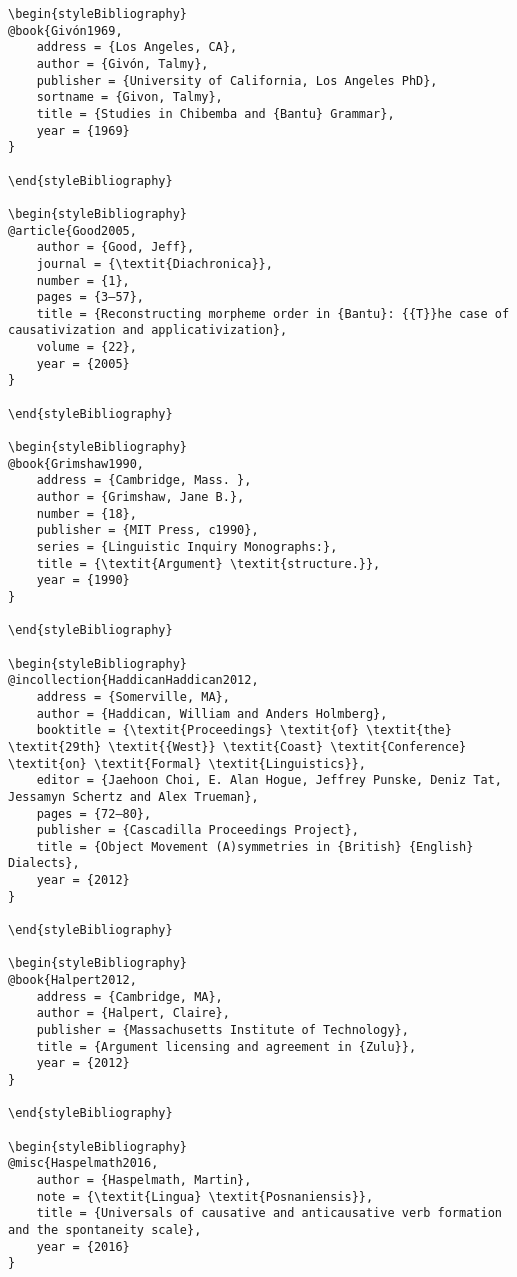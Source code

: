 \documentclass[output=paper]{langscibook}
\begin{document}
\begin{verbatim}
\begin{styleBibliography}
@book{Givón1969,
	address = {Los Angeles, CA},
	author = {Givón, Talmy},
	publisher = {University of California, Los Angeles PhD},
	sortname = {Givon, Talmy},
	title = {Studies in Chibemba and {Bantu} Grammar},
	year = {1969}
}

\end{styleBibliography}

\begin{styleBibliography}
@article{Good2005,
	author = {Good, Jeff},
	journal = {\textit{Diachronica}},
	number = {1},
	pages = {3–57},
	title = {Reconstructing morpheme order in {Bantu}: {{T}}he case of causativization and applicativization},
	volume = {22},
	year = {2005}
}

\end{styleBibliography}

\begin{styleBibliography}
@book{Grimshaw1990,
	address = {Cambridge, Mass. },
	author = {Grimshaw, Jane B.},
	number = {18},
	publisher = {MIT Press, c1990},
	series = {Linguistic Inquiry Monographs:},
	title = {\textit{Argument} \textit{structure.}},
	year = {1990}
}

\end{styleBibliography}

\begin{styleBibliography}
@incollection{HaddicanHaddican2012,
	address = {Somerville, MA},
	author = {Haddican, William and Anders Holmberg},
	booktitle = {\textit{Proceedings} \textit{of} \textit{the} \textit{29th} \textit{{West}} \textit{Coast} \textit{Conference} \textit{on} \textit{Formal} \textit{Linguistics}},
	editor = {Jaehoon Choi, E. Alan Hogue, Jeffrey Punske, Deniz Tat, Jessamyn Schertz and Alex Trueman},
	pages = {72–80},
	publisher = {Cascadilla Proceedings Project},
	title = {Object Movement (A)symmetries in {British} {English} Dialects},
	year = {2012}
}

\end{styleBibliography}

\begin{styleBibliography}
@book{Halpert2012,
	address = {Cambridge, MA},
	author = {Halpert, Claire},
	publisher = {Massachusetts Institute of Technology},
	title = {Argument licensing and agreement in {Zulu}},
	year = {2012}
}

\end{styleBibliography}

\begin{styleBibliography}
@misc{Haspelmath2016,
	author = {Haspelmath, Martin},
	note = {\textit{Lingua} \textit{Posnaniensis}},
	title = {Universals of causative and anticausative verb formation and the spontaneity scale},
	year = {2016}
}


\end{verbatim}
\end{document}
